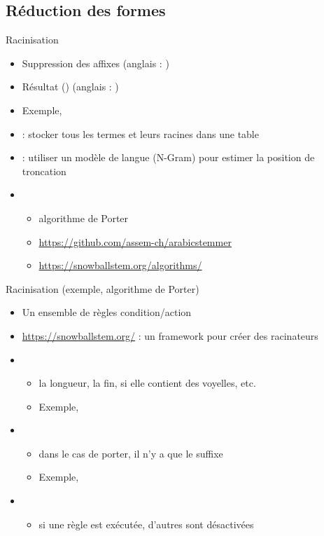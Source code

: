 \documentclass{KodeBook}
\begin{document}
\subsection{Réduction des formes}

Racinisation
\begin{itemize}
	\item Suppression des affixes (anglais : )
	\item Résultat  () (anglais : )
	\item Exemple, 
	\item {} : stocker tous les termes et leurs racines dans une table
	\item {} : utiliser un modèle de langue (N-Gram) pour estimer la position de troncation
	\item {}
	\begin{itemize}
		\item algorithme de Porter \cite{1980-porter}
		\item \url{https://github.com/assem-ch/arabicstemmer}
		\item \url{https://snowballstem.org/algorithms/}
	\end{itemize}
\end{itemize}

Racinisation (exemple, algorithme de Porter)
\begin{itemize}
	\item Un ensemble de règles condition/action
	\item \url{https://snowballstem.org/} : un framework pour créer des racinateurs
	\item {}
	\begin{itemize}
		\item la longueur, la fin, si elle contient des voyelles, etc.
		\item Exemple, 
	\end{itemize}
	\item {}
	\begin{itemize}
		\item dans le cas de porter, il n'y a que le suffixe 
		\item Exemple, 
	\end{itemize}
	\item {}
	\begin{itemize}
		\item si une règle est exécutée, d'autres sont désactivées
	\end{itemize}
\end{itemize}
\end{document}
